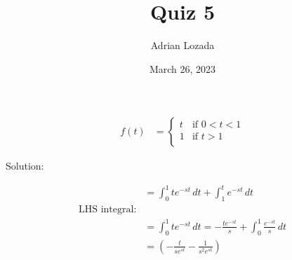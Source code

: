 \documentclass{article}
\title{Quiz 5}
\author{Adrian Lozada}
\date{March 26, 2023}
\begin{document}
    \maketitle
    \newpage
    \begin{align*}
        f(t) &= 
        \begin{cases}
            t & \text{if } 0 < t < 1 \\
            1 & \text{if } t > 1 \\
        \end{cases}
    \end{align*}
    \begin{flushleft}
        Solution: \\
    \end{flushleft}
    \begin{align*}
        &= \int_0^1 te^{-st} \, dt + \int_1^t e^{-st} \, dt \\
        \text{LHS integral:} \\
        &= \int_0^1 te^{-st} \, dt = -\frac{te^{-st}}{s} + \int_{0}^{1} \frac{e^{-st}}{s} \, dt \\
        &= \left( -\frac{t}{se^{st}} - \frac{1}{s^{2}e^{st}}\right)
    \end{align*}
\end{document}
